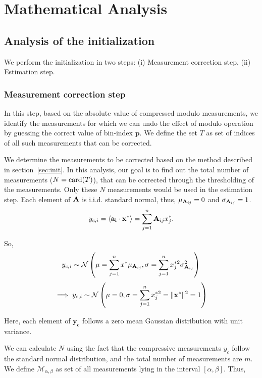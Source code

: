 \section{Mathematical Analysis}
\label{sec:mathanalysis}
\subsection{Analysis of the initialization}
We perform the initialization in two steps:
(i) Measurement correction step, (ii) Estimation step.

\subsubsection{Measurement correction step}\label{meascorr}In this step, based on the absolute value of compressed modulo measurements, we identify the measurements for which we can undo the effect of modulo operation by guessing the correct value of bin-index $\mathbf{p}$. We define the set $T$ as set of indices of all such measurements that can be corrected.

We determine the measurements to be corrected based on the method described in section~\ref{sec:init}. 
In this analysis, our goal is to find out the total number of measurements ($N=\mathrm{card}(T)$), that can be corrected through the thresholding of the measurements. Only these $N$ measurements would be used in the estimation step.
Each element of $\mathbf{A}$ is i.i.d. standard normal, thus, $\mu_{\mathbf{A}_{ij}} = 0$ and $\sigma_{\mathbf{A}_{ij}}=1$.
$$
y_{c,i} =\langle \mathbf{a_i} \cdot \mathbf{x^*} \rangle = \sum_{j=1}^{n}\mathbf{A}_{ij}x^*_{j}.
$$

So, 
$$
y_{c,i} \sim \mathcal{N}\left(\mu= \sum_{j=1}^{n}x^{*}\mu_{\mathbf{A}_{ij}}, \sigma =\sum_{j=1}^{n}x^{*2}_{j}\sigma^2_{\mathbf{A}_{ij}}\right)
$$
$$
\implies y_{c,i} \sim \mathcal{N}\left(\mu= 0, \sigma =\sum_{j=1}^{n}x^{*2}_{j} = \|\mathbf{{x}^*}\|^2 = 1 \right)
$$

Here, each element of $\mathbf{y_c}$ follows a zero mean Gaussian distribution with unit variance.

We can calculate $N$ using the fact that the compressive measurements $y_c$ follow the standard normal distribution, and the total number of measurements are $m$. We define $\mathcal{M}_{\alpha,\beta}$ as set of all measurements lying in the interval $[\alpha,\beta]$. Thus,


